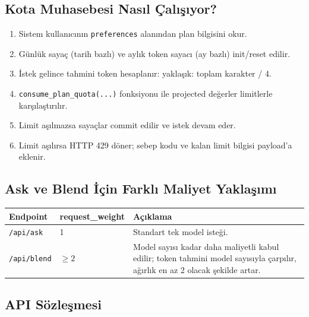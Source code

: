 \documentclass[11pt,a4paper]{article}
\begin{document}
\subsection{Kota Muhasebesi Nasıl Çalışıyor?}

\begin{enumerate}[leftmargin=1.5em]
  \item Sistem kullanıcının \texttt{preferences} alanından plan bilgisini okur.
  \item Günlük sayaç (tarih bazlı) ve aylık token sayacı (ay bazlı) init/reset edilir.
  \item İstek gelince tahmini token hesaplanır: yaklaşık: toplam karakter / 4.
  \item \texttt{consume\_plan\_quota(...)} fonksiyonu ile projected değerler limitlerle karşılaştırılır.
  \item Limit aşılmazsa sayaçlar commit edilir ve istek devam eder.
  \item Limit aşılırsa HTTP 429 döner; sebep kodu ve kalan limit bilgisi payload'a eklenir.
\end{enumerate}

\subsection{Ask ve Blend İçin Farklı Maliyet Yaklaşımı}

\begin{tabularx}{\textwidth}{@{} L{3cm} C{3cm} X @{}}
\toprule
\textbf{Endpoint} & \textbf{request\_weight} & \textbf{Açıklama} \\
\midrule
\texttt{/api/ask} & 1 & Standart tek model isteği. \\
\addlinespace
\texttt{/api/blend} & $\geq 2$ & Model sayısı kadar daha maliyetli kabul edilir; token tahmini model sayısıyla çarpılır, ağırlık en az 2 olacak şekilde artar. \\
\bottomrule
\end{tabularx}

\subsection{API Sözleşmesi}
\end{document}
